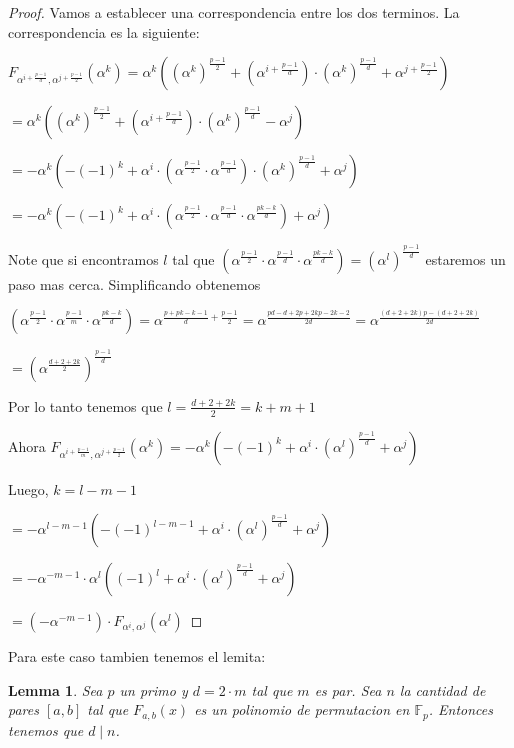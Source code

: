 \documentclass[12pt]{article}
\newtheorem{lemma}{Lemma}
\begin{document}
\begin{proof}
Vamos a establecer una correspondencia entre los dos terminos. La correspondencia es la siguiente:

$F_{\alpha^{i+\frac{p-1}{d}},\alpha^{j+\frac{p-1}{2}}}(\alpha^{k}) = \alpha^k((\alpha^k)^{\frac{p-1}{2}}+(\alpha^{i+\frac{p-1}{d}})\cdot(\alpha^k)^{\frac{p-1}{d}}+\alpha^{j+\frac{p-1}{2}})$

$ = \alpha^k((\alpha^k)^{\frac{p-1}{2}}+(\alpha^{i+\frac{p-1}{d}})\cdot(\alpha^k)^{\frac{p-1}{d}}-\alpha^{j})$

$ = -\alpha^k(-(-1)^k+\alpha^{i}\cdot (\alpha^{\frac{p-1}{2}}\cdot \alpha^{\frac{p-1}{d}})\cdot(\alpha^k)^{\frac{p-1}{d}}+\alpha^{j})$

$ = -\alpha^k(-(-1)^k+\alpha^{i}\cdot (\alpha^{\frac{p-1}{2}}\cdot \alpha^{\frac{p-1}{d}} \cdot \alpha^{\frac{pk-k}{d}})+\alpha^{j})$

Note que si encontramos $l$ tal que $(\alpha^{\frac{p-1}{2}}\cdot \alpha^{\frac{p-1}{d}} \cdot \alpha^{\frac{pk-k}{d}}) = (\alpha^{l})^{\frac{p-1}{d}}$ estaremos un paso mas cerca. Simplificando obtenemos

$(\alpha^{\frac{p-1}{2}}\cdot \alpha^{\frac{p-1}{m}} \cdot \alpha^{\frac{pk-k}{d}}) = \alpha^{\frac{p+pk-k-1}{d}+\frac{p-1}{2}}=\alpha^{\frac{pd-d+2p+2kp-2k-2}{2d}} = \alpha^{\frac{\left( d+2+2k \right)p-\left( d+2+2k \right)}{2d}}$

$ = (\alpha^{\frac{d+2+2k}{2}})^{\frac{p-1}{d}} $

Por lo tanto tenemos que $l=\frac{d+2+2k}{2}=k+m+1$

Ahora $F_{\alpha^{i+\frac{p-1}{m}},\alpha^{j+\frac{p-1}{2}}}(\alpha^{k}) = -\alpha^k(-(-1)^k+\alpha^{i}\cdot (\alpha^{l})^{\frac{p-1}{d}}+\alpha^{j})$

Luego, $k = l-m-1$

$ = -\alpha^{l-m-1}(-(-1)^{l-m-1}+\alpha^{i}\cdot (\alpha^{l})^{\frac{p-1}{d}}+\alpha^{j})$

$ = -\alpha^{-m-1}\cdot \alpha^{l}((-1)^{l}+\alpha^{i}\cdot (\alpha^{l})^{\frac{p-1}{d}}+\alpha^{j})$

$ = \left(-\alpha^{-m-1}\right)\cdot F_{\alpha^i,\alpha^j}(\alpha^l)$
\end{proof}

Para este caso tambien tenemos el lemita:

\begin{lemma}
    Sea $p$ un primo y $d=2\cdot m$ tal que $m$ es par. Sea $n$ la cantidad de pares $[a,b]$ tal que $F_{a,b}(x)$ es un polinomio de permutacion en $\mathbb{F}_p$. Entonces tenemos que $d\mid n$.
\end{lemma}
\end{document}
